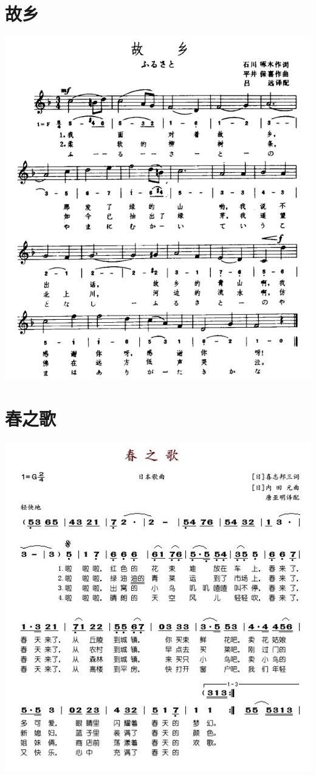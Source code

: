 \documentclass[cn,pad,chinese,chinesefont=nofont]{elegantbook}
\begin{document}
\section{故乡}
	\includegraphics[width=\textwidth]{dongxiao/日本-故乡.png}
\section{春之歌}
    \includegraphics[width=\textwidth]{dongxiao/日本-春之歌.jpg}
\end{document}
